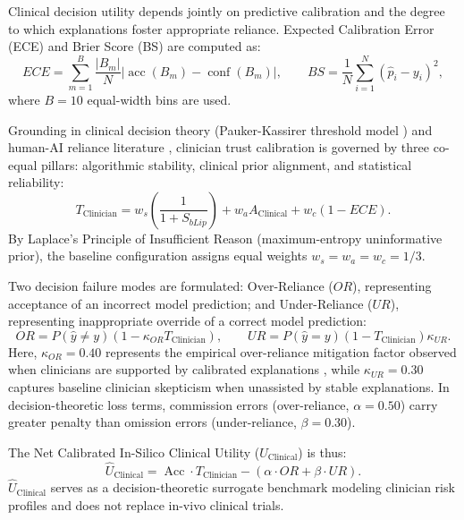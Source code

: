 \documentclass[3p,times,procedia]{elsarticle}
\theoremstyle{definition}
\begin{document}
Clinical decision utility depends jointly on predictive calibration and the degree to which explanations foster appropriate reliance. Expected Calibration Error (ECE) and Brier Score (BS) are computed as:
\begin{equation}
ECE = \sum_{m=1}^{B}\frac{|B_m|}{N}\left|\operatorname{acc}(B_m)-\operatorname{conf}(B_m)\right|, \qquad BS=\frac{1}{N}\sum_{i=1}^{N}(\hat{p}_i-y_i)^2,
\label{eq:calibration}
\end{equation}
where $B=10$ equal-width bins are used.

Grounding in clinical decision theory (Pauker-Kassirer threshold model \cite{pauker1980threshold}) and human-AI reliance literature \cite{bussone2015trust,jacobs2021designing,naiseh2023trust}, clinician trust calibration is governed by three co-equal pillars: algorithmic stability, clinical prior alignment, and statistical reliability:
\begin{equation}
T_{\mathrm{Clinician}} = w_s \left(\frac{1}{1+S_{bLip}}\right) + w_a A_{\mathrm{Clinical}} + w_c (1-ECE).
\label{eq:tclinician}
\end{equation}
By Laplace's Principle of Insufficient Reason (maximum-entropy uninformative prior), the baseline configuration assigns equal weights $w_s = w_a = w_c = 1/3$.

Two decision failure modes are formulated: Over-Reliance ($OR$), representing acceptance of an incorrect model prediction; and Under-Reliance ($UR$), representing inappropriate override of a correct model prediction:
\begin{equation}
OR = P(\hat{y}\neq y)\left(1-\kappa_{OR} T_{\mathrm{Clinician}}\right), \qquad UR = P(\hat{y}=y)\left(1-T_{\mathrm{Clinician}}\right)\kappa_{UR}.
\label{eq:or_ur}
\end{equation}
Here, $\kappa_{OR} = 0.40$ represents the empirical over-reliance mitigation factor observed when clinicians are supported by calibrated explanations \cite{bussone2015trust,jacobs2021designing}, while $\kappa_{UR} = 0.30$ captures baseline clinician skepticism when unassisted by stable explanations. In decision-theoretic loss terms, commission errors (over-reliance, $\alpha = 0.50$) carry greater penalty than omission errors (under-reliance, $\beta = 0.30$).

The Net Calibrated In-Silico Clinical Utility ($\widehat{U}_{\mathrm{Clinical}}$) is thus:
\begin{equation}
\widehat{U}_{\mathrm{Clinical}} = \operatorname{Acc} \cdot T_{\mathrm{Clinician}} - \left(\alpha \cdot OR + \beta \cdot UR\right).
\label{eq:uclinical}
\end{equation}
$\widehat{U}_{\mathrm{Clinical}}$ serves as a decision-theoretic surrogate benchmark modeling clinician risk profiles and does not replace in-vivo clinical trials.
\end{document}
